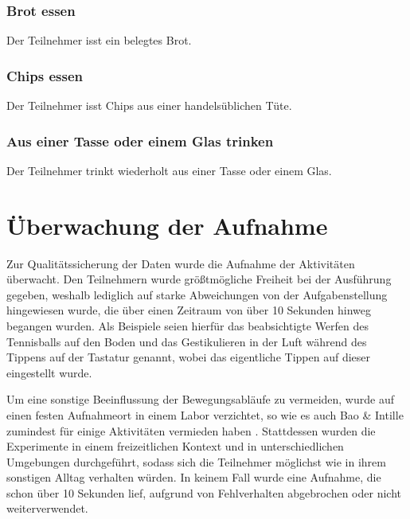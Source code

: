\subsubsection{Brot essen}
Der Teilnehmer isst ein belegtes Brot.
\subsubsection{Chips essen}
Der Teilnehmer isst Chips aus einer handelsüblichen Tüte.
\subsubsection{Aus einer Tasse oder einem Glas trinken}
Der Teilnehmer trinkt wiederholt aus einer Tasse oder einem Glas.

\newpage

\section{Überwachung der Aufnahme}
Zur Qualitätssicherung der Daten wurde die Aufnahme der Aktivitäten überwacht. Den Teilnehmern wurde größtmögliche Freiheit bei der Ausführung gegeben, weshalb lediglich auf starke Abweichungen von der Aufgabenstellung hingewiesen wurde, die über einen Zeitraum von über 10 Sekunden hinweg begangen wurden. Als Beispiele seien hierfür das beabsichtigte Werfen des Tennisballs auf den Boden und das Gestikulieren in der Luft während des Tippens auf der Tastatur genannt, wobei das eigentliche Tippen auf dieser eingestellt wurde.

Um eine sonstige Beeinflussung der Bewegungsabläufe zu vermeiden, wurde auf einen festen Aufnahmeort in einem Labor verzichtet, so wie es auch Bao \& Intille zumindest für einige Aktivitäten vermieden haben \cite{Bao2004}. Stattdessen wurden die Experimente in einem freizeitlichen Kontext und in unterschiedlichen Umgebungen durchgeführt, sodass sich die Teilnehmer möglichst wie in ihrem sonstigen Alltag verhalten würden. In keinem Fall wurde eine Aufnahme, die schon über 10 Sekunden lief, aufgrund von Fehlverhalten abgebrochen oder nicht weiterverwendet.

